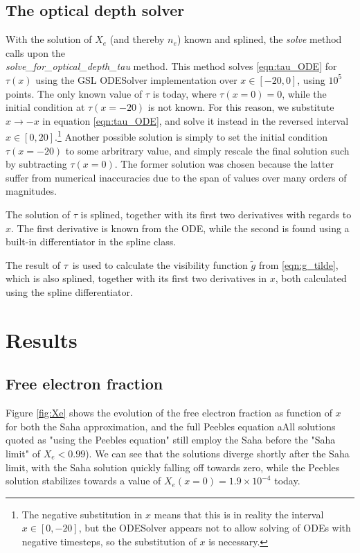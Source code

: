 \documentclass[10pt, a4paper]{article}
\begin{document}
\subsection{The optical depth solver}
With the solution of $X_e$ (and thereby $n_e$) known and splined, the \textit{solve} method calls upon the\\
\textit{solve\_for\_optical\_depth\_tau} method. This method solves \ref{eqn:tau_ODE} for $\tau(x)$ using the GSL ODESolver implementation over $x\in[-20, 0]$, using $10^5$ points. The only known value of $\tau$ is today, where $\tau(x=0) = 0$, while the initial condition at $\tau(x=-20)$ is not known. For this reason, we substitute $x \rightarrow -x$ in equation \ref{eqn:tau_ODE}, and solve it instead in the reversed interval $x\in[0, 20]$.\footnote{The negative substitution in $x$ means that this is in reality the interval $x\in [0, -20]$, but the ODESolver appears not to allow solving of ODEs with negative timesteps, so the substitution of $x$ is necessary.} Another possible solution is simply to set the initial condition $\tau(x=-20)$ to some arbritrary value, and simply rescale the final solution such by subtracting $\tau(x=0)$. The former solution was chosen because the latter suffer from numerical inaccuracies due to the span of values over many orders of magnitudes.

The solution of $\tau$ is splined, together with its first two derivatives with regards to $x$. The first derivative is known from the ODE, while the second is found using a built-in differentiator in the spline class.

The result of $\tau$ is used to calculate the visibility function $\tilde{g}$ from \ref{eqn:g_tilde}, which is also splined, together with its first two derivatives in $x$, both calculated using the spline differentiator.



\section{Results}
\subsection{Free electron fraction}
Figure \ref{fig:Xe} shows the evolution of the free electron fraction as function of $x$ for both the Saha approximation, and the full Peebles equation aAll solutions quoted as "using the Peebles equation" still employ the Saha before the "Saha limit" of $X_e < 0.99$). We can see that the solutions diverge shortly after the Saha limit, with the Saha solution quickly falling off towards zero, while the Peebles solution stabilizes towards a value of $X_e(x=0) = 1.9\times 10^{-4}$ today.
\end{document}
